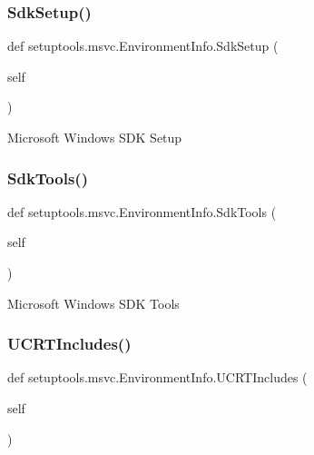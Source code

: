 \subsubsection{\texorpdfstring{Sdk\+Setup()}{SdkSetup()}}
{\footnotesize\ttfamily def setuptools.\+msvc.\+Environment\+Info.\+Sdk\+Setup (\begin{DoxyParamCaption}\item[{}]{self }\end{DoxyParamCaption})}

\begin{DoxyVerb}Microsoft Windows SDK Setup
\end{DoxyVerb}
 \mbox{\label{classsetuptools_1_1msvc_1_1_environment_info_acb23a9749e0fe111972811bf363d4d06}} 
\subsubsection{\texorpdfstring{Sdk\+Tools()}{SdkTools()}}
{\footnotesize\ttfamily def setuptools.\+msvc.\+Environment\+Info.\+Sdk\+Tools (\begin{DoxyParamCaption}\item[{}]{self }\end{DoxyParamCaption})}

\begin{DoxyVerb}Microsoft Windows SDK Tools
\end{DoxyVerb}
 \mbox{\label{classsetuptools_1_1msvc_1_1_environment_info_ae8cddbeb1c6a6d60edc6e46104ef30d0}} 
\subsubsection{\texorpdfstring{U\+C\+R\+T\+Includes()}{UCRTIncludes()}}
{\footnotesize\ttfamily def setuptools.\+msvc.\+Environment\+Info.\+U\+C\+R\+T\+Includes (\begin{DoxyParamCaption}\item[{}]{self }\end{DoxyParamCaption})}

